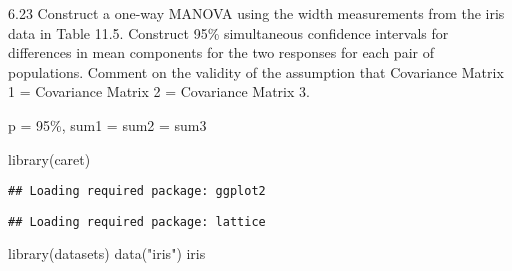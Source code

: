 \documentclass[
]{article}
\newenvironment{Shaded}{\begin{snugshade}}{\end{snugshade}}
\newcommand{\FunctionTok}[1]{\textcolor[rgb]{0.00,0.00,0.00}{#1}}
\newcommand{\NormalTok}[1]{#1}
\newcommand{\StringTok}[1]{\textcolor[rgb]{0.31,0.60,0.02}{#1}}
\begin{document}
6.23 Construct a one-way MANOVA using the width measurements from the
iris data in Table 11.5. Construct 95\% simultaneous confidence
intervals for differences in mean components for the two responses for
each pair of populations. Comment on the validity of the assumption that
Covariance Matrix 1 = Covariance Matrix 2 = Covariance Matrix 3.

p = 95\%, sum1 = sum2 = sum3

\begin{Shaded}
\begin{Highlighting}[]
\FunctionTok{library}\NormalTok{(caret)}
\end{Highlighting}
\end{Shaded}

\begin{verbatim}
## Loading required package: ggplot2
\end{verbatim}

\begin{verbatim}
## Loading required package: lattice
\end{verbatim}

\begin{Shaded}
\begin{Highlighting}[]
\FunctionTok{library}\NormalTok{(datasets)}
\FunctionTok{data}\NormalTok{(}\StringTok{"iris"}\NormalTok{)}
\NormalTok{iris}
\end{Highlighting}
\end{Shaded}
\end{document}
